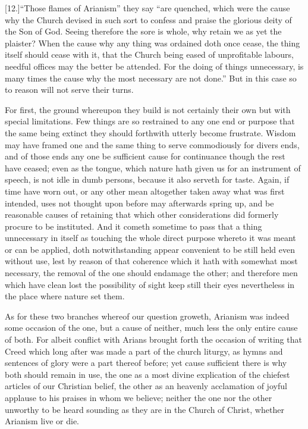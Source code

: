 [12.]“Those flames of Arianism” they say “are quenched, which were the cause why the Church devised in such sort to confess and praise the glorious deity of the Son of God. Seeing therefore the sore is whole, why retain we as yet the plaister? When the cause why any thing was ordained doth once cease, the thing itself should cease with it, that the Church being eased of unprofitable labours, needful offices may the better be attended. For the doing of things unnecessary, is many times the cause why the most necessary are not done.” But in this case so to reason will not serve their turns.

For first, the ground whereupon they build is not certainly their own but with special limitations. Few things are so restrained to any one end or purpose that the same being extinct they should forthwith utterly become frustrate. Wisdom may have framed one and the same thing to serve commodiously for divers ends, and of those ends any one be sufficient cause for continuance though the rest have ceased; even as  the tongue, which nature hath given us for an instrument of speech, is not idle in dumb persons, because it also serveth for taste.
 Again, if time have worn out, or any other mean altogether taken away what was first intended, uses not thought upon before may afterwards spring up, and be reasonable causes of retaining that which other considerations did formerly procure to be instituted. And it cometh sometime to pass that a thing unnecessary in itself as touching the whole direct purpose whereto it was meant or can be applied, doth notwithstanding appear convenient to be still held even without use, lest by reason of that coherence which it hath with somewhat most necessary, the removal of the one should endamage the other; and therefore men which have clean lost the possibility of sight keep still their eyes nevertheless in the place where nature set them.

As for these two branches whereof our question groweth, Arianism was indeed some occasion of the one, but a cause of neither, much less the only entire cause of both. For albeit conflict with Arians brought forth the occasion of writing that Creed which long after was made a part of the church liturgy, as hymns and sentences of glory were a part thereof before; yet cause sufficient there is why both should remain in use, the one as a most divine explication of the chiefest articles of our Christian belief, the other as an heavenly acclamation of joyful applause to his praises in whom we believe; neither the one nor the other unworthy to be heard sounding as they are in the Church of Christ, whether Arianism live or die.

